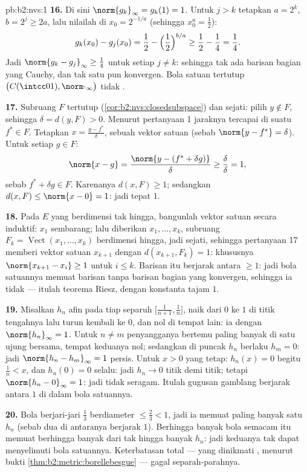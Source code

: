 \begin{solution}{pb:b2:nvs:1}
\textbf{16.} Di sini $\norm{g_k}_\infty = g_k(1) = 1$. Untuk $j > k$
tetapkan $a = 2^k$, $b = 2^j \geq 2a$, lalu nilailah di $x_0 = 2^{-1/a}$
(sehingga $x_0^a = \frac12$):
\[
g_k(x_0) - g_j(x_0) = \frac12 - \Bigl(\frac12\Bigr)^{b/a}
\geq \frac12 - \frac14 = \frac14 .
\]
Jadi $\norm{g_k - g_j}_\infty \geq \frac14$ untuk setiap $j \neq k$:
sehingga tak ada barisan bagian yang Cauchy, dan tak satu pun konvergen.
Bola satuan tertutup $\bigl(C(\intcc01), \norm\cdot_\infty\bigr)$ tidak .

\textbf{17.} Subruang $F$ tertutup (\cref{cor:b2:nvs:closedsubspace})
dan sejati: pilih $y \notin F$, sehingga $\delta = d(y, F) > 0$. Menurut
pertanyaan 1 jaraknya tercapai di suatu $f^* \in F$. Tetapkan $x
= \frac{y - f^*}{\delta}$, sebuah vektor satuan (sebab $\norm{y - f^*} =
\delta$). Untuk setiap $g \in F$:
\[
\norm{x - g} = \frac{\norm{y - (f^* + \delta g)}}{\delta}
\geq \frac{\delta}{\delta} = 1 ,
\]
sebab $f^* + \delta g \in F$. Karenanya $d(x, F) \geq 1$; sedangkan $d(x,
F) \leq \norm{x - 0} = 1$: jadi tepat $1$.

\textbf{18.} Pada $E$ yang berdimensi tak hingga, bangunlah vektor satuan
secara induktif: $x_1$ sembarang; lalu diberikan $x_1, \dots, x_k$,
subruang $F_k = \operatorname{Vect}(x_1, \dots, x_k)$ berdimensi
hingga, jadi sejati, sehingga pertanyaan 17 memberi vektor satuan
$x_{k+1}$ dengan $d(x_{k+1}, F_k) = 1$: khususnya
$\norm{x_{k+1} - x_i} \geq 1$ untuk $i \leq k$. Barisan itu berjarak
antara $\geq 1$: jadi bola satuannya memuat barisan
tanpa barisan bagian yang konvergen, sehingga ia tidak  ---
itulah teorema Riesz, dengan konstanta tajam $1$.

\textbf{19.} Misalkan $h_n$ afin pada tiap separuh
$\bigl[\frac1{n+1}, \frac1n\bigr]$, naik dari $0$ ke $1$ di
titik tengahnya lalu turun kembali ke $0$, dan nol di tempat lain: ia
 dengan $\norm{h_n}_\infty = 1$. Untuk $n \neq m$ penyangganya
bertemu paling banyak di satu ujung bersama, tempat keduanya nol;
sedangkan di puncak $h_n$ berlaku $h_m = 0$: jadi $\norm{h_n -
h_m}_\infty = 1$ persis. Untuk $x > 0$ yang tetap: $h_n(x) = 0$ begitu
$\frac1n < x$, dan $h_n(0) = 0$ selalu: jadi $h_n \to 0$ titik demi
titik; tetapi $\norm{h_n - 0}_\infty = 1$: jadi tidak seragam. Itulah
gugusan gamblang berjarak antara $1$ di dalam bola satuannya.

\textbf{20.} Bola berjari-jari $\frac13$ berdiameter $\leq
\frac23 < 1$, jadi ia memuat paling banyak satu $h_n$ (sebab dua di
antaranya berjarak $1$). Berhingga banyak bola semacam itu memuat
berhingga banyak dari tak hingga banyak $h_n$: jadi keduanya tak dapat
menyelimuti bola satuannya. Keterbatasan total --- yang dinikmati , menurut bukti \cref{thm:b2:metric:borellebesgue} ---
gagal separah-parahnya.


\end{solution}
